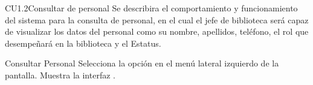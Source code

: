 \begin{UseCase}{CU1.2}{Consultar de personal}{
	Se describira el comportamiento y funcionamiento del sistema para la consulta de personal, en el cual el jefe de biblioteca será capaz de visualizar los datos del personal como su nombre, apellidos, teléfono, el rol que desempeñará en la biblioteca y el Estatus.
}
	\end{UseCase}
	\begin{UCtrayectoria}{Consultar Personal}
		\UCpaso[\UCactor]Selecciona la opción  en el menú lateral izquierdo de la pantalla.
		\UCpaso[\UCsist] Muestra la interfaz .
			
	\end{UCtrayectoria}
